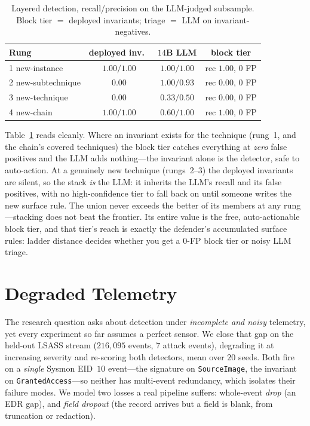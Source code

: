 \documentclass[sigconf,nonacm]{acmart}
\begin{document}
\begin{table}[t]
\caption{Layered detection, recall/precision on the LLM-judged subsample. Block
tier $=$ deployed invariants; triage $=$ LLM on invariant-negatives.}
\label{tab:layering}
\small
\begin{tabular}{@{}lccc@{}}
\toprule
Rung & deployed inv.\ & $14$B LLM & block tier \\
\midrule
1 new-instance     & $1.00/1.00$ & $1.00/1.00$ & rec $1.00$, $0$ FP \\
2 new-subtechnique & $0.00$      & $1.00/0.93$ & rec $0.00$, $0$ FP \\
3 new-technique    & $0.00$      & $0.33/0.50$ & rec $0.00$, $0$ FP \\
4 new-chain        & $1.00/1.00$ & $0.60/1.00$ & rec $1.00$, $0$ FP \\
\bottomrule
\end{tabular}
\end{table}

Table~\ref{tab:layering} reads cleanly. Where an invariant exists for the
technique (rung~1, and the chain's covered techniques) the block tier catches
everything at \emph{zero} false positives and the LLM adds nothing---the
invariant alone is the detector, safe to auto-action. At a genuinely new
technique (rungs~2--3) the deployed invariants are silent, so the stack
\emph{is} the LLM: it inherits the LLM's recall and its false positives, with no
high-confidence tier to fall back on until someone writes the new surface rule.
The union never exceeds the better of its members at any rung---stacking does
not beat the frontier. Its entire value is the free, auto-actionable block tier,
and that tier's reach is exactly the defender's accumulated surface rules:
ladder distance decides whether you get a $0$-FP block tier or noisy LLM triage.

\section{Degraded Telemetry}
\label{sec:degraded}
The research question asks about detection under \emph{incomplete and noisy}
telemetry, yet every experiment so far assumes a perfect sensor. We close that
gap on the held-out LSASS stream ($216{,}095$ events, $7$ attack events),
degrading it at increasing severity and re-scoring both detectors, mean over
$20$ seeds. Both fire on a \emph{single} Sysmon EID~$10$ event---the signature on
\texttt{SourceImage}, the invariant on \texttt{GrantedAccess}---so neither has
multi-event redundancy, which isolates their failure modes. We model two losses a
real pipeline suffers: whole-event \emph{drop} (an EDR gap), and \emph{field
dropout} (the record arrives but a field is blank, from truncation or redaction).
\end{document}

